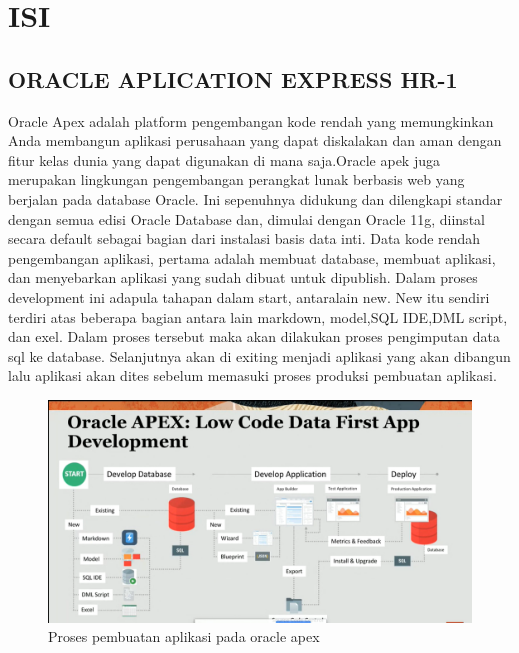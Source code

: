 \chapter{ISI}

\section{ORACLE APLICATION EXPRESS HR-1}
Oracle Apex adalah platform pengembangan kode rendah yang memungkinkan Anda membangun aplikasi perusahaan yang dapat diskalakan dan aman dengan fitur kelas dunia yang dapat digunakan di mana saja.Oracle apek juga merupakan lingkungan pengembangan perangkat lunak berbasis web yang berjalan pada database Oracle. Ini sepenuhnya didukung dan dilengkapi standar dengan semua edisi Oracle Database dan, dimulai dengan Oracle 11g, diinstal secara default sebagai bagian dari instalasi basis data inti. Data kode rendah pengembangan aplikasi, pertama adalah membuat database, membuat aplikasi, dan menyebarkan aplikasi yang sudah dibuat untuk dipublish. Dalam proses development ini adapula tahapan dalam start, antaralain new. New itu sendiri terdiri atas beberapa bagian antara lain markdown, model,SQL IDE,DML script, dan exel. Dalam proses tersebut maka akan dilakukan proses pengimputan data sql ke database. Selanjutnya akan di exiting menjadi aplikasi yang akan dibangun lalu aplikasi akan dites sebelum memasuki proses produksi pembuatan aplikasi. 
\begin{figure}[!htbp]
    \centering
    \includegraphics[scale=0.65]{section/hiya.PNG}
    \caption{Proses pembuatan aplikasi pada oracle apex}
    \label{gambar 1}
\end{figure}

